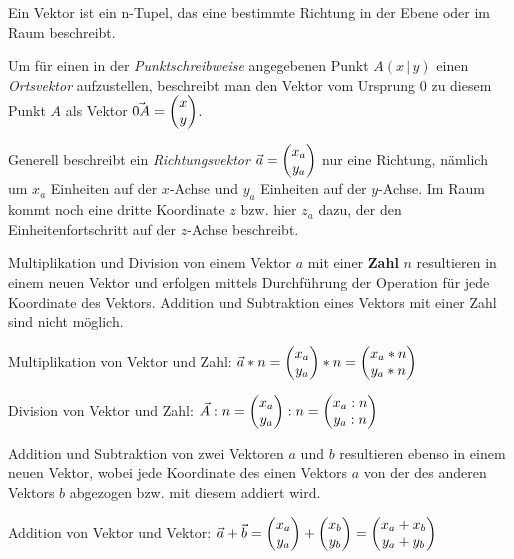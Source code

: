 



\thispagestyle{plain}

Ein Vektor ist ein n-Tupel, das eine bestimmte Richtung in der Ebene oder im Raum beschreibt.


Um f\"{u}r einen in der \emph{Punktschreibweise} angegebenen Punkt $A (x\, |\, y)$ einen \emph{Ortsvektor} aufzustellen, beschreibt man den Vektor vom Ursprung $0$ zu diesem Punkt $A$ als Vektor $\vec{0A} = \begin{pmatrix}x\\y\end{pmatrix}$.

Generell beschreibt ein \emph{Richtungsvektor} $\vec{a} = \begin{pmatrix}x_{a} \\ y_{a}\end{pmatrix}$ nur eine Richtung, n\"{a}mlich um $x_{a}$ Einheiten auf der $x$-Achse und $y_{a}$ Einheiten auf der $y$-Achse. Im Raum kommt noch eine dritte Koordinate $z$ bzw. hier $z_{a}$ dazu, der den Einheitenfortschritt auf der $z$-Achse beschreibt.



Multiplikation und Division von einem Vektor $a$ mit einer \textbf{Zahl} $n$ resultieren in einem neuen Vektor und erfolgen mittels Durchf\"{u}hrung der Operation f\"{u}r jede Koordinate des Vektors. Addition und Subtraktion eines Vektors mit einer Zahl sind nicht m\"{o}glich.

Multiplikation von Vektor und Zahl: $ \vec{a} * n = \begin{pmatrix}x_{a}\\y_{a}\end{pmatrix} * n  = \begin{pmatrix}x_{a} * n \\ y_{a} * n\end{pmatrix}$

Division von Vektor und Zahl: $ \vec{A} : n = \begin{pmatrix}x_{a}\\y_{a}\end{pmatrix} : n = \begin{pmatrix}x_{a} : n \\ y_{a} : n\end{pmatrix}$


Addition und Subtraktion von zwei Vektoren $a$ und $b$ resultieren ebenso in einem neuen Vektor, wobei jede Koordinate des einen Vektors $a$ von der des anderen Vektors $b$ abgezogen bzw. mit diesem addiert wird.

Addition von Vektor und Vektor: $\vec{a} + \vec{b} = \begin{pmatrix}x_{a}\\y_{a}\end{pmatrix} + \begin{pmatrix}x_{b}\\y_{b}\end{pmatrix} = \begin{pmatrix}x_{a} + x_{b} \\ y_{a} + y_{b}\end{pmatrix}$

